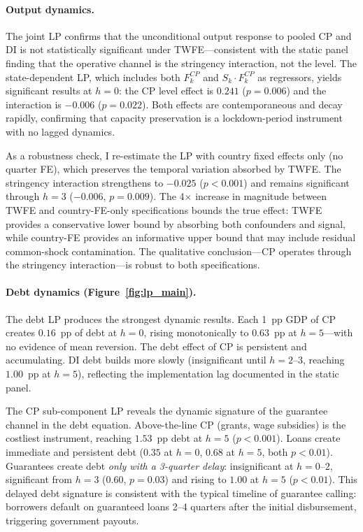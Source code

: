 \paragraph{Output dynamics.} The joint LP confirms that the unconditional output response to pooled CP and DI is not statistically significant under TWFE---consistent with the static panel finding that the operative channel is the stringency interaction, not the level. The state-dependent LP, which includes both $F_k^{CP}$ and $S_k \cdot F_k^{CP}$ as regressors, yields significant results at $h = 0$: the CP level effect is $0.241$ ($p = 0.006$) and the interaction is $-0.006$ ($p = 0.022$). Both effects are contemporaneous and decay rapidly, confirming that capacity preservation is a lockdown-period instrument with no lagged dynamics.

As a robustness check, I re-estimate the LP with country fixed effects only (no quarter FE), which preserves the temporal variation absorbed by TWFE. The stringency interaction strengthens to $-0.025$ ($p < 0.001$) and remains significant through $h = 3$ ($-0.006$, $p = 0.009$). The 4$\times$ increase in magnitude between TWFE and country-FE-only specifications bounds the true effect: TWFE provides a conservative lower bound by absorbing both confounders and signal, while country-FE provides an informative upper bound that may include residual common-shock contamination. The qualitative conclusion---CP operates through the stringency interaction---is robust to both specifications.

\paragraph{Debt dynamics (Figure~\ref{fig:lp_main}).} The debt LP produces the strongest dynamic results. Each 1~pp GDP of CP creates $0.16$~pp of debt at $h = 0$, rising monotonically to $0.63$~pp at $h = 5$---with no evidence of mean reversion. The debt effect of CP is persistent and accumulating. DI debt builds more slowly (insignificant until $h = 2$--$3$, reaching $1.00$~pp at $h = 5$), reflecting the implementation lag documented in the static panel.

The CP sub-component LP reveals the dynamic signature of the guarantee channel in the debt equation. Above-the-line CP (grants, wage subsidies) is the costliest instrument, reaching $1.53$~pp debt at $h = 5$ ($p < 0.001$). Loans create immediate and persistent debt ($0.35$ at $h = 0$, $0.68$ at $h = 5$, both $p < 0.01$). Guarantees create debt \textit{only with a 3-quarter delay}: insignificant at $h = 0$--$2$, significant from $h = 3$ ($0.60$, $p = 0.03$) and rising to $1.00$ at $h = 5$ ($p < 0.01$). This delayed debt signature is consistent with the typical timeline of guarantee calling: borrowers default on guaranteed loans 2--4 quarters after the initial disbursement, triggering government payouts.

